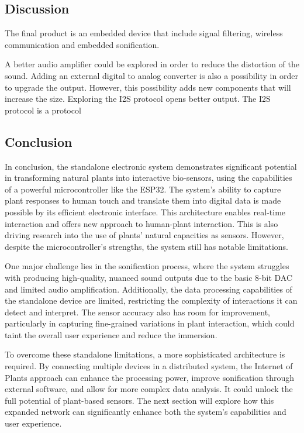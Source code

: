 \subsection{Discussion}

The final product is an embedded device that include signal filtering, wireless communication and embedded sonification.





A better audio amplifier could be explored in order to reduce the distortion of the sound.
Adding an external digital to analog converter is also a possibility in order to upgrade the output. However,
this possibility adds new components that will increase the size. Exploring the I2S protocol opens better output.
The I2S protocol is a protocol  %


\subsection{Conclusion}

In conclusion, the standalone electronic system demonstrates significant potential in transforming natural plants into interactive bio-sensors, using the capabilities of a powerful microcontroller like the ESP32. The system's ability to capture plant responses to human touch and translate them into digital data is made possible by its efficient electronic interface. This architecture enables real-time interaction and offers new approach to human-plant interaction. This is also driving research into the use of plants' natural capacities as sensors. However, despite the microcontroller's strengths, the system still has notable limitations.

One major challenge lies in the sonification process, where the system struggles with producing high-quality, nuanced sound outputs due to the basic 8-bit DAC and limited audio amplification. Additionally, the data processing capabilities of the standalone device are limited, restricting the complexity of interactions it can detect and interpret. The sensor accuracy also has room for improvement, particularly in capturing fine-grained variations in plant interaction, which could taint the overall user experience and reduce the immersion.

To overcome these standalone limitations, a more sophisticated architecture is required. By connecting multiple devices in a distributed system, the Internet of Plants approach can enhance the processing power, improve sonification through external software, and allow for more complex data analysis. It could unlock the  full potential of plant-based sensors. The next section will explore how this expanded network can significantly enhance both the system's capabilities and user experience.